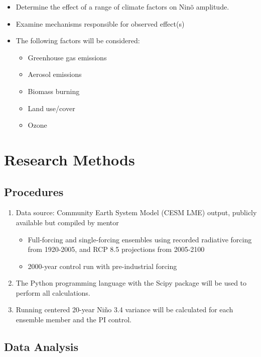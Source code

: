 \documentclass{article}
\begin{document}
\begin{itemize}

	\item Determine the effect of a range of climate factors on Nin\~{o} amplitude.
	\item Examine mechanisms responsible for observed effect(s)
	\item The following factors will be considered:
	\begin{itemize}
		\item Greenhouse gas emissions
		\item Aerosol emissions
		\item Biomass burning
		\item Land use/cover
		\item Ozone
	\end{itemize}
	
\end{itemize}

\section{Research Methods}

\subsection{Procedures}

\begin{enumerate}

	\item Data source: Community Earth System Model (CESM LME) output, publicly available but compiled by mentor
	\begin{itemize}
		\item Full-forcing and single-forcing ensembles using recorded radiative forcing from 1920-2005, and RCP 8.5 projections from 2005-2100
		\item 2000-year control run with pre-industrial forcing
	\end{itemize}
	\item The Python programming language with the Scipy package will be used to perform all calculations.
	\item Running centered 20-year Ni\~{n}o 3.4 variance will be calculated for each ensemble member and the PI control.

\end{enumerate}


\subsection{Data Analysis}
\end{document}
